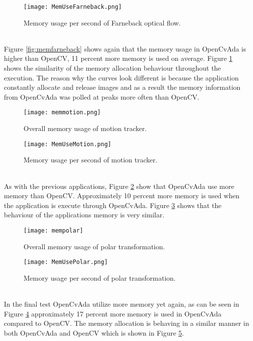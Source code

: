 \begin{figure}
\centering
\texttt{[image: MemUseFarneback.png]}
\caption{Memory usage per second of Farneback optical flow.}
\label{fig:MemUseFarneback}
\end{figure}
\\Figure \ref{fig:memfarneback} shows again that the memory usage in OpenCvAda is higher than OpenCV, 11 percent more memory is used on average. Figure \ref{fig:MemUseFarneback} shows the similarity of the memory allocation behaviour throughout the execution. The reason why the curves look different is because the application constantly allocate and release images and as a result the memory information from OpenCvAda was polled at peaks more often than OpenCV.
\begin{figure}
\centering
\texttt{[image: memmotion.png]}
\caption{Overall memory usage of motion tracker.}
\label{fig:memmotion}
\end{figure}
\begin{figure}
\centering
\texttt{[image: MemUseMotion.png]}
\caption{Memory usage per second of motion tracker.}
\label{fig:MemUseMotion}
\end{figure}
\\As with the previous applications, Figure \ref{fig:memmotion} show that OpenCvAda use more memory than OpenCV. Approximately 10 percent more memory is used when the application is execute through OpenCvAda. Figure \ref{fig:MemUseMotion} shows that the behaviour of the applications memory is very similar.
\begin{figure}
\centering
\texttt{[image: mempolar]}
\caption{Overall memory usage of polar transformation.}
\label{fig:mempolar}
\end{figure}
\begin{figure}
\centering
\texttt{[image: MemUsePolar.png]}
\caption{Memory usage per second of polar transformation.}
\label{fig:MemUsePolar}
\end{figure}
\\In the final test OpenCvAda utilize more memory yet again, as can be seen in Figure \ref{fig:mempolar} approximately 17 percent more memory is used in OpenCvAda compared to OpenCV. The memory allocation is behaving in a similar manner in both OpenCvAda and OpenCV which is shown in Figure \ref{fig:MemUsePolar}.
